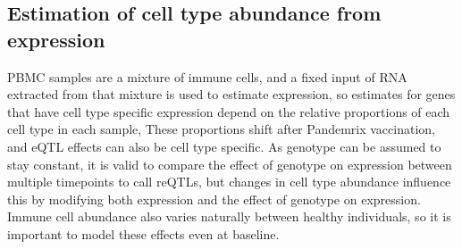 \subsection{Estimation of cell type abundance from expression}
\label{subsec:hird_reQTL_xCell}

\Gls{PBMC} samples are a mixture of immune cells, and a fixed input of RNA extracted from that mixture is used to estimate expression, 
so estimates for genes that have cell type specific expression depend on the relative proportions of each cell type in each sample, 
These proportions shift after Pandemrix vaccination\autocite{sobolev2016AdjuvantedInfluenzaH1N1Vaccination},
and \gls{eQTL} effects can also be cell type specific.
As genotype can be assumed to stay constant, it is valid to compare the effect of genotype on expression between multiple timepoints to call \glspl{reQTL}, 
but changes in cell type abundance influence this by modifying both expression and the effect of genotype on expression.
Immune cell abundance also varies naturally between healthy individuals\autocite{brodin2015VariationHumanImmune,brodin2017HumanImmuneSystem}, so it is important to model these effects even at baseline.

